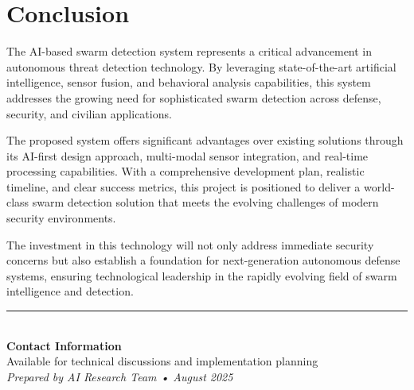 \documentclass[11pt,a4paper]{article}
\begin{document}
\section{Conclusion}

\begin{highlight}
The AI-based swarm detection system represents a critical advancement in autonomous threat detection technology. By leveraging state-of-the-art artificial intelligence, sensor fusion, and behavioral analysis capabilities, this system addresses the growing need for sophisticated swarm detection across defense, security, and civilian applications.
\end{highlight}

The proposed system offers significant advantages over existing solutions through its AI-first design approach, multi-modal sensor integration, and real-time processing capabilities. With a comprehensive development plan, realistic timeline, and clear success metrics, this project is positioned to deliver a world-class swarm detection solution that meets the evolving challenges of modern security environments.

The investment in this technology will not only address immediate security concerns but also establish a foundation for next-generation autonomous defense systems, ensuring technological leadership in the rapidly evolving field of swarm intelligence and detection.

\vfill

\begin{center}
\rule{0.8\textwidth}{0.5pt}\\
\vspace{0.5cm}
\textbf{Contact Information}\\
Available for technical discussions and implementation planning\\
\textit{Prepared by AI Research Team • August 2025}
\end{center}
\end{document}
